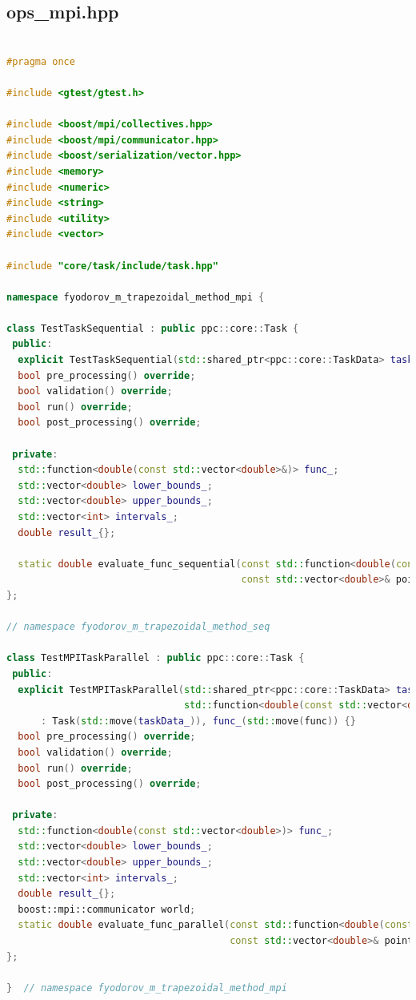 \documentclass{article}
\begin{document}
\subsection{ops\_mpi.hpp}
\begin{lstlisting}[language=C++]

#pragma once

#include <gtest/gtest.h>

#include <boost/mpi/collectives.hpp>
#include <boost/mpi/communicator.hpp>
#include <boost/serialization/vector.hpp>
#include <memory>
#include <numeric>
#include <string>
#include <utility>
#include <vector>

#include "core/task/include/task.hpp"

namespace fyodorov_m_trapezoidal_method_mpi {

class TestTaskSequential : public ppc::core::Task {
 public:
  explicit TestTaskSequential(std::shared_ptr<ppc::core::TaskData> taskData_) : Task(std::move(taskData_)) {}
  bool pre_processing() override;
  bool validation() override;
  bool run() override;
  bool post_processing() override;

 private:
  std::function<double(const std::vector<double>&)> func_;
  std::vector<double> lower_bounds_;
  std::vector<double> upper_bounds_;
  std::vector<int> intervals_;
  double result_{};

  static double evaluate_func_sequential(const std::function<double(const std::vector<double>&)>& func,
                                         const std::vector<double>& point);
};

// namespace fyodorov_m_trapezoidal_method_seq

class TestMPITaskParallel : public ppc::core::Task {
 public:
  explicit TestMPITaskParallel(std::shared_ptr<ppc::core::TaskData> taskData_,
                               std::function<double(const std::vector<double>&)> func)
      : Task(std::move(taskData_)), func_(std::move(func)) {}
  bool pre_processing() override;
  bool validation() override;
  bool run() override;
  bool post_processing() override;

 private:
  std::function<double(const std::vector<double>)> func_;
  std::vector<double> lower_bounds_;
  std::vector<double> upper_bounds_;
  std::vector<int> intervals_;
  double result_{};
  boost::mpi::communicator world;
  static double evaluate_func_parallel(const std::function<double(const std::vector<double>&)>& func,
                                       const std::vector<double>& point);
};

}  // namespace fyodorov_m_trapezoidal_method_mpi

\end{lstlisting}
\end{document}
